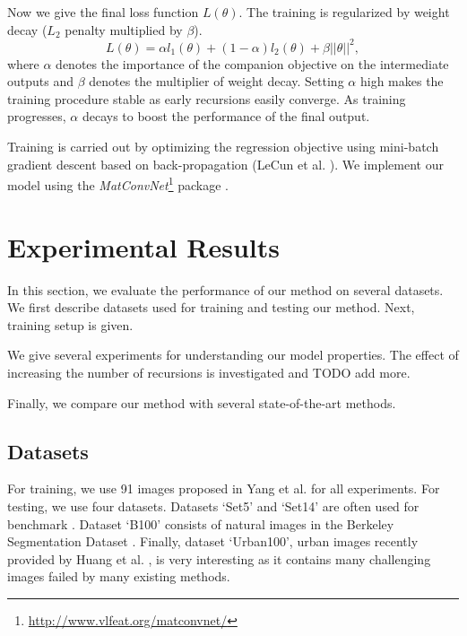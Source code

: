 \documentclass[10pt,twocolumn,letterpaper]{article}
\begin{document}
Now we give the final loss function $L(\theta)$. The training is regularized by weight decay ($L_2$ penalty multiplied by $\beta$). 
\begin{equation}
L(\theta)  =\alpha  l_1(\theta) + (1 - \alpha) l_2(\theta) + \beta ||\theta||^2,
\end{equation}
where $\alpha$ denotes the importance of the companion objective on the intermediate outputs and $\beta$ denotes the multiplier of weight decay.   Setting $\alpha$ high makes the training procedure stable as early recursions easily converge. As training progresses, $\alpha$ decays to boost the performance of the final output. 

Training is carried out by optimizing the regression objective using mini-batch gradient descent based on back-propagation (LeCun et al. \cite{lecun1998gradient}). We implement our model using the \textit{MatConvNet}\footnote{\url{ http://www.vlfeat.org/matconvnet/}} package \cite{arXiv:1412.4564}. 


\section{Experimental Results}
In this section, we evaluate the performance of our method on several datasets. We first describe datasets used for training and testing our method. Next, training setup is given. 

We give several experiments for understanding our model properties. The effect of increasing the number of recursions is investigated and TODO add more.  

Finally, we compare our method with several state-of-the-art methods. 

\subsection{Datasets}
For training, we use 91 images proposed in Yang et al. \cite{yang2010image} for all experiments. For testing, we use four datasets. Datasets `Set5' \cite{bevilacqua2012} and `Set14' \cite{zeyde2012single} are often used for benchmark \cite{Timofte,Timofte2013,dong2014image}. Dataset `B100'  consists of natural images in the Berkeley Segmentation Dataset \cite{Martin2001}. Finally, dataset `Urban100', urban images recently provided by Huang et al. \cite{Huang-CVPR-2015}, is very interesting as it contains many challenging images failed by many existing methods.
\end{document}
